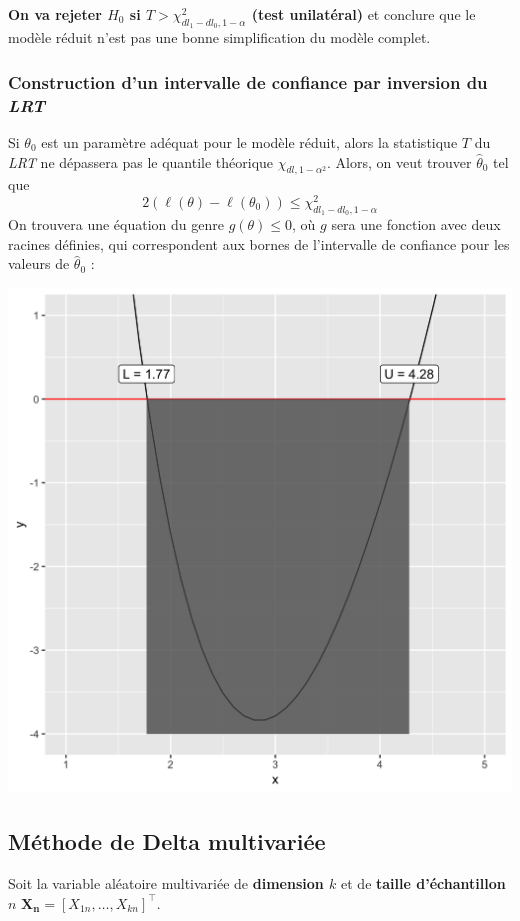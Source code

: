 \documentclass[10pt, french]{article}
\begin{document}
\begin{multicols*}{3}
\textbf{On va rejeter $H_0$ si $T >\chi_{dl_1 - dl_0, 1-\alpha}^2 $ (test unilatéral)} et conclure que le modèle réduit n'est pas une bonne simplification du modèle complet.

\subsubsection*{Construction d'un intervalle de confiance par inversion du \emph{LRT}}
Si $\theta_0$ est un paramètre adéquat pour le modèle réduit, alors la statistique $T$ du \emph{LRT} ne dépassera pas le quantile théorique $\chi_{dl, 1- \alpha^2}$. 
Alors, on veut trouver $\hat{\theta}_0$ tel que
\[2 \left( \ell(\theta) - \ell(\theta_0) \right) \leq  \chi_{dl_1 - dl_0, 1-\alpha}^2\]
On trouvera une équation du genre $g(\theta) \leq 0$, où $g$ sera une fonction avec deux racines définies, qui correspondent aux bornes de l'intervalle de confiance pour les valeurs de $\hat{\theta}_0$ : 

\begin{center}
	\includegraphics[scale = 0.07]{src/Q13-57_visualisation.png}
\end{center}

\subsection*{Méthode de Delta multivariée}
\begin{definitionNOHFILL}
Soit la variable aléatoire multivariée de \textbf{dimension $k$} et de \textbf{taille d'échantillon $n$} $\bm{X_{n}} = [X_{1n}, \dots, X_{kn}]^{\top}$.


\end{definitionNOHFILL}
\end{multicols*}
\end{document}
